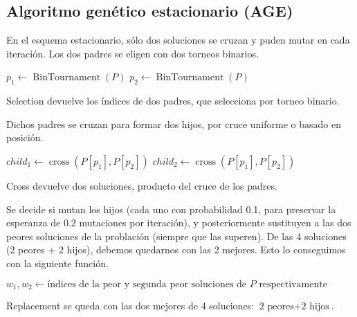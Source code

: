 \documentclass{article}
\begin{document}
\subsection{Algoritmo genético estacionario (AGE)}

En el esquema estacionario, sólo dos soluciones se cruzan y puden mutar en cada iteración. Los dos padres se eligen con dos
torneos binarios.

\begin{algorithm}[H]
	\DontPrintSemicolon %
	$p_1\gets\operatorname{BinTournament}(P)$\;
	$p_2\gets\operatorname{BinTournament}(P)$\;
	\;
	\caption{{\sc Selection} devuelve los índices de dos padres, que selecciona por torneo binario.}
	\label{alg:selection-stationary}
\end{algorithm}

Dichos padres se cruzan para formar dos hijos, por cruce uniforme o basado en posición.

\begin{algorithm}[H]
	\DontPrintSemicolon %
	$child_1\gets\operatorname{cross}(P[p_1],P[p_2])$\;
	$child_2\gets\operatorname{cross}(P[p_1],P[p_2])$\;
	\;
	\caption{{\sc Cross} devuelve dos soluciones, producto del cruce de los padres.}
	\label{alg:cross-stationary}
\end{algorithm}

Se decide si mutan los hijos (cada uno con probabilidad 0.1, para preservar la esperanza de 0.2 mutaciones por iteración), y posteriormente sustituyen a las dos peores soluciones de la problación (siempre que las superen).
De las 4 soluciones (2 peores + 2 hijos), debemos quedarnos con las 2 mejores. Esto lo conseguimos con la siguiente función.

\begin{algorithm}[H]
	\DontPrintSemicolon %
	$w_1,w_2\gets\text{índices de la peor y segunda peor soluciones de $P$ respectivamente}$\;
	\caption{{\sc Replacement} se queda con las dos mejores de 4 soluciones: $\text{2 peores} + \text{2 hijos}$.}
	\label{alg:replacement-stationary}
\end{algorithm}
\end{document}
